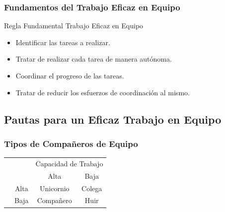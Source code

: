 \documentclass[a4paper,t,xcolor=pst,dvips]{beamer}
\begin{document}
\begin{frame}[c]
	\frametitle{Fundamentos del Trabajo Eficaz en Equipo}
	\begin{block}{Regla Fundamental Trabajo Eficaz en Equipo}
		\begin{itemize}[<+->]
			\item Identificar las tareas a realizar.
			\item Tratar de realizar cada tarea de manera autónoma.
			\item Coordinar el progreso de las tareas. 
			\item Tratar de reducir los esfuerzos de coordinación al mismo.
		\end{itemize}
	\end{block}
\end{frame}

\subsection{Pautas para un Eficaz Trabajo en Equipo}

\begin{frame}[c]
	\frametitle{Tipos de Compañeros de Equipo}
	
	\renewcommand{\arraystretch}{2.0}
	
	\begin{center}
		\begin{tabular}{|l|p{2cm}|p{2cm}|p{2cm}|}
			\cline{3-4}
			\multicolumn{2}{l}{}  & \multicolumn{2}{|c|}{Capacidad de  Trabajo} \\ \cline{3-4}
			\multicolumn{2}{l|}{} & \multicolumn{1}{c|}{Alta}                 & 
			\multicolumn{1}{c|}{Baja}         \\ \cline{1-4}
			\multirow{2}{*}{\rotatebox[origin=c]{90}{Afinidad}} & 
			\multicolumn{1}{c|}{Alta} & \multicolumn{1}{c|}{Unicornio} & \multicolumn{1}{c|}{Colega} \\
			\cline{2-4}
			& \multicolumn{1}{c|}{Baja} & \multicolumn{1}{c|}{Compañero}  & \multicolumn{1}{c|}{Huir} \\
			\cline{1-4}
		\end{tabular}
	\end{center}
\end{frame}
\end{document}
